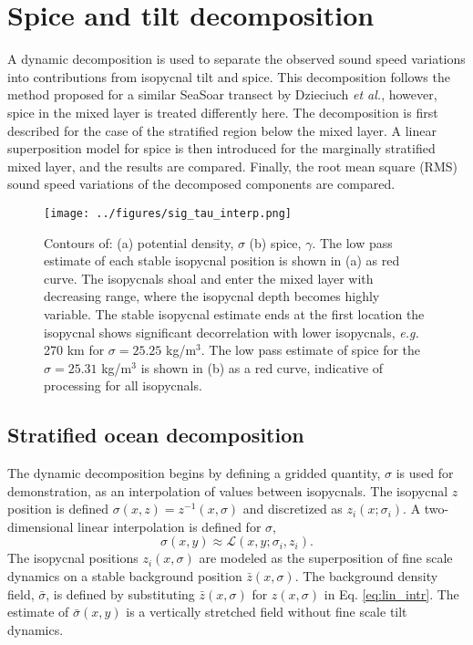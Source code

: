 \documentclass[preprint,NumberedRefs]{JASA}
\begin{document}
\section{\label{sec:decomposition}Spice and tilt decomposition}
A dynamic decomposition is used to separate the observed sound speed variations into contributions from isopycnal tilt and spice. This decomposition follows the method proposed for a similar SeaSoar transect by Dzieciuch \emph{et al.},\citep{dzieciuch2004} however, spice in the mixed layer is treated differently here. The decomposition is first described for the case of the stratified region below the mixed layer. A linear superposition model for spice is then introduced for the marginally stratified mixed layer, and the results are compared. Finally, the root mean square (RMS) sound speed variations of the decomposed components are compared.

\begin{figure}
\texttt{[image: ../figures/sig\_tau\_interp.png]}
    \caption{\label{fig:cntrs}{Contours of: (a) potential density, $\sigma$ (b) spice, $\gamma$. The low pass estimate of each stable isopycnal position is shown in (a) as red curve. The isopycnals shoal and enter the mixed layer with decreasing range, where the isopycnal depth becomes highly variable. The stable isopycnal estimate ends at the first location the isopycnal shows significant decorrelation with lower isopycnals, \emph{e.g.} 270 km for $\sigma=25.25$ kg/m$^3$. The low pass estimate of spice for the $\sigma=25.31$ kg/m$^3$ is shown in (b) as a red curve, indicative of processing for all isopycnals.}}
\end{figure}

\subsection{Stratified ocean decomposition}
The dynamic decomposition begins by defining a gridded quantity, $\sigma$ is used for demonstration, as an interpolation of values between isopycnals. The isopycnal $z$ position is defined $\sigma(x, z) = z^{-1}(x, \sigma)$ and discretized as $z_i(x; \sigma_i)$. A two-dimensional linear interpolation is defined for $\sigma$,
\begin{equation}
    \sigma(x,y)\approx\mathcal{L}(x, y; \sigma_i, z_i).
    \label{eq:lin_intr}
\end{equation}
The isopycnal positions $z_i(x, \sigma)$ are modeled as the superposition of fine scale dynamics on a stable background position $\bar{z}(x, \sigma)$. The background density field, $\bar{\sigma}$, is defined by substituting $\bar{z}(x, \sigma)$ for $z(x, \sigma)$ in Eq. \eqref{eq:lin_intr}. The estimate of $\bar{\sigma}(x,y)$ is a vertically stretched field without fine scale tilt dynamics.
\end{document}
